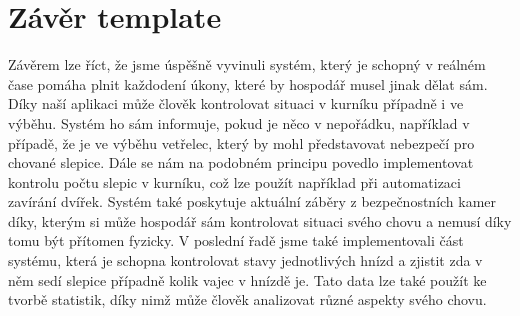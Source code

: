 ﻿\newpage
\chapter{Závěr template}
Závěrem lze říct, že jsme úspěšně vyvinuli systém, který je schopný v reálném čase pomáha plnit každodení úkony, které by hospodář musel jinak dělat sám. Díky naší aplikaci může člověk kontrolovat situaci v kurníku případně i ve výběhu. Systém ho sám informuje, pokud je něco v nepořádku, například v případě, že je ve výběhu vetřelec, který by mohl představovat nebezpečí pro chované slepice. Dále se nám na podobném principu povedlo implementovat kontrolu počtu slepic v kurníku, což lze použít například při automatizaci zavírání dvířek. Systém také poskytuje aktuální záběry z bezpečnostních kamer díky, kterým si může hospodář sám kontrolovat situaci svého chovu a nemusí díky tomu být přítomen fyzicky. V poslední řadě jsme také implementovali část systému, která je schopna kontrolovat stavy jednotlivých hnízd a zjistit zda v něm sedí slepice případně kolik vajec v hnízdě je. Tato data lze také použít ke tvorbě statistik, díky nimž může člověk analizovat různé aspekty svého chovu.

